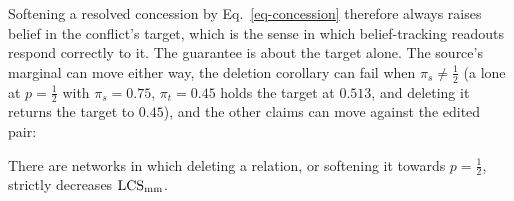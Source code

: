 Softening a resolved concession by Eq.~\ref{eq-concession} therefore always raises belief in the
conflict's target, which is the sense in which belief-tracking readouts respond correctly to it. The
guarantee is about the target alone. The source's marginal can move either way, the deletion
corollary can fail when $\pi_s\neq\tfrac12$ (a lone \con{} at $p=\tfrac12$ with $\pi_s=0.75$,
$\pi_t=0.45$ holds the target at $0.513$, and deleting it returns the target to $0.45$), and the
other claims can move against the edited pair:

\begin{proposition}
\label{prop-nonmono}
There are networks in which deleting a \con{} relation, or softening it towards $p=\tfrac12$,
strictly decreases $\mathrm{LCS}_{\mathrm{mm}}$.
\end{proposition}
